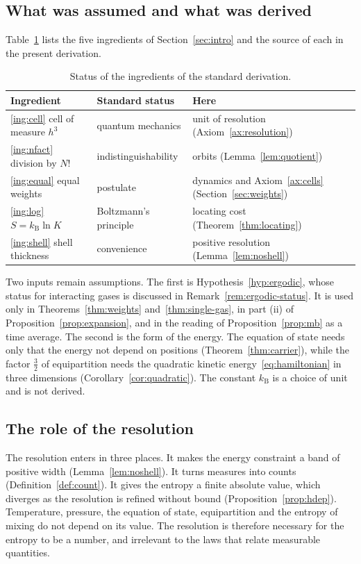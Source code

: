 \documentclass[11pt,a4paper]{article}
\theoremstyle{definition}
\theoremstyle{remark}
\newcommand{\kB}{k_{\mathrm{B}}}
\begin{document}
\subsection{What was assumed and what was derived}

Table~\ref{tab:status} lists the five ingredients of Section~\ref{sec:intro} and the source of each in the present derivation.

\begin{table}[ht]
\centering
\caption{Status of the ingredients of the standard derivation.}
\label{tab:status}
\begin{tabular}{@{}lll@{}}
\toprule
Ingredient & Standard status & Here \\
\midrule
\ref{ing:cell} cell of measure $h^{3}$ & quantum mechanics & unit of resolution (Axiom~\ref{ax:resolution}) \\
\ref{ing:nfact} division by $N!$ & indistinguishability & orbits (Lemma~\ref{lem:quotient}) \\
\ref{ing:equal} equal weights & postulate & dynamics and Axiom~\ref{ax:cells} (Section~\ref{sec:weights}) \\
\ref{ing:log} $S=\kB\ln K$ & Boltzmann's principle & locating cost (Theorem~\ref{thm:locating}) \\
\ref{ing:shell} shell thickness & convenience & positive resolution (Lemma~\ref{lem:noshell}) \\
\bottomrule
\end{tabular}
\end{table}

Two inputs remain assumptions.
The first is Hypothesis~\ref{hyp:ergodic}, whose status for interacting gases is discussed in Remark~\ref{rem:ergodic-status}.
It is used only in Theorems~\ref{thm:weights} and~\ref{thm:single-gas}, in part (ii) of Proposition~\ref{prop:expansion}, and in the reading of Proposition~\ref{prop:mb} as a time average.
The second is the form of the energy.
The equation of state needs only that the energy not depend on positions (Theorem~\ref{thm:carrier}), while the factor $\tfrac32$ of equipartition needs the quadratic kinetic energy~\eqref{eq:hamiltonian} in three dimensions (Corollary~\ref{cor:quadratic}).
The constant $\kB$ is a choice of unit and is not derived.

\subsection{The role of the resolution}

The resolution enters in three places.
It makes the energy constraint a band of positive width (Lemma~\ref{lem:noshell}).
It turns measures into counts (Definition~\ref{def:count}).
It gives the entropy a finite absolute value, which diverges as the resolution is refined without bound (Proposition~\ref{prop:hdep}).
Temperature, pressure, the equation of state, equipartition and the entropy of mixing do not depend on its value.
The resolution is therefore necessary for the entropy to be a number, and irrelevant to the laws that relate measurable quantities.
\end{document}
